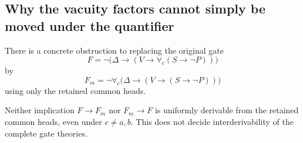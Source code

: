 \subsection{Why the vacuity factors cannot simply be moved under the quantifier}
\label{sec:factor-movement-countermodel}

There is a concrete obstruction to replacing the original gate
\[
 F=\neg\bigl(\Delta\to(V\to\forall_c(S\to\neg P))\bigr)
\]
by
\[
 F_m=\neg\forall_c\bigl(\Delta\to(V\to(S\to\neg P))\bigr)
\]
using only the retained common heads.

\begin{lemma}
Neither implication $F\to F_m$ nor $F_m\to F$ is uniformly
derivable from the retained common heads, even under $c\ne a,b$.
This does not decide interderivability of the complete gate theories.
\end{lemma}
